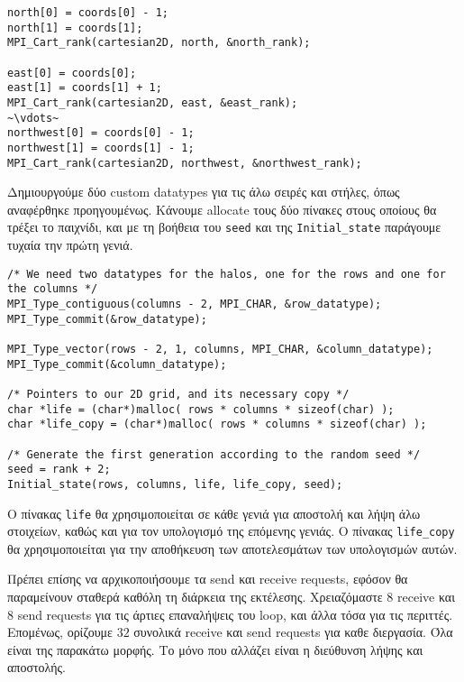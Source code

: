 \begin{tcolorbox}
\begin{verbatim}
north[0] = coords[0] - 1;
north[1] = coords[1];
MPI_Cart_rank(cartesian2D, north, &north_rank);

east[0] = coords[0];
east[1] = coords[1] + 1;
MPI_Cart_rank(cartesian2D, east, &east_rank);
~\vdots~
northwest[0] = coords[0] - 1;
northwest[1] = coords[1] - 1;
MPI_Cart_rank(cartesian2D, northwest, &northwest_rank);
\end{verbatim}
\end{tcolorbox}

Δημιουργούμε δύο custom datatypes για τις άλω σειρές και στήλες, όπως αναφέρθηκε προηγουμένως. Κάνουμε allocate τους δύο πίνακες στους οποίους θα τρέξει το παιχνίδι, και με τη βοήθεια του \texttt{seed} και της \texttt{Initial_state} παράγουμε τυχαία την πρώτη γενιά. 

\begin{tcolorbox}
\begin{verbatim}
/* We need two datatypes for the halos, one for the rows and one for the columns */
MPI_Type_contiguous(columns - 2, MPI_CHAR, &row_datatype);
MPI_Type_commit(&row_datatype);

MPI_Type_vector(rows - 2, 1, columns, MPI_CHAR, &column_datatype);
MPI_Type_commit(&column_datatype);

/* Pointers to our 2D grid, and its necessary copy */
char *life = (char*)malloc( rows * columns * sizeof(char) );
char *life_copy = (char*)malloc( rows * columns * sizeof(char) );

/* Generate the first generation according to the random seed */
seed = rank + 2;
Initial_state(rows, columns, life, life_copy, seed);
\end{verbatim}

\begin{tcolorbox}[colback=white,fonttitle=\bfseries\large,title=Σημείωση]
Ο πίνακας \texttt{life} θα χρησιμοποιείται σε κάθε γενιά για αποστολή και λήψη άλω στοιχείων, καθώς και για τον υπολογισμό της επόμενης γενιάς. Ο πίνακας \texttt{life_copy} θα χρησιμοποιείται για την αποθήκευση των αποτελεσμάτων των υπολογισμών αυτών.
\end{tcolorbox}
\end{tcolorbox}
Πρέπει επίσης να αρχικοποιήσουμε τα send και receive requests, εφόσον θα παραμείνουν σταθερά καθόλη τη διάρκεια της εκτέλεσης. Χρειαζόμαστε $8$ receive και $8$ send requests για τις άρτιες επαναλήψεις του loop, και άλλα τόσα για τις περιττές. Επομένως, ορίζουμε $32$ συνολικά receive και send requests για καθε διεργασία. Όλα είναι της παρακάτω μορφής. Το μόνο που αλλάζει είναι η διεύθυνση λήψης και αποστολής.

